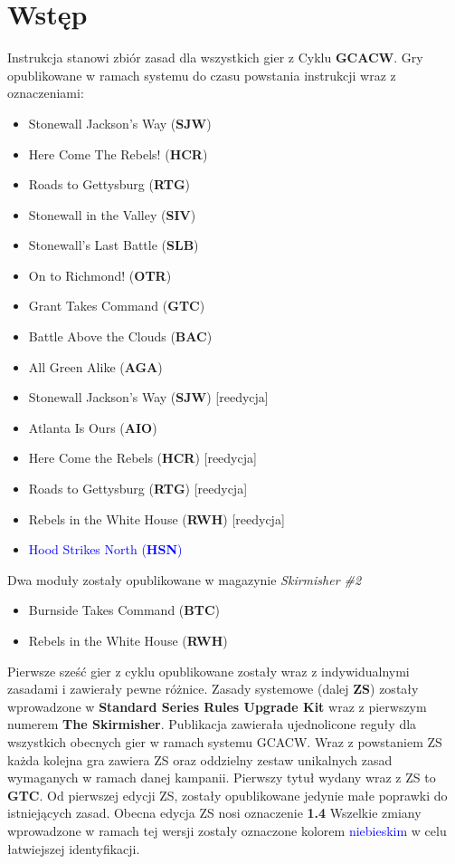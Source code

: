 \section{Wstęp}

Instrukcja stanowi zbiór zasad dla wszystkich gier z Cyklu \textbf{GCACW}. Gry opublikowane w ramach systemu do czasu powstania instrukcji wraz z oznaczeniami:
\begin{itemize}
  \item Stonewall Jackson’s Way (\textbf{SJW})
  \item Here Come The Rebels! (\textbf{HCR})
  \item Roads to Gettysburg (\textbf{RTG})
  \item Stonewall in the Valley (\textbf{SIV})
  \item Stonewall’s Last Battle (\textbf{SLB})
  \item On to Richmond! (\textbf{OTR})
  \item Grant Takes Command (\textbf{GTC})
  \item Battle Above the Clouds (\textbf{BAC})
  \item All Green Alike (\textbf{AGA})
  \item Stonewall Jackson’s Way (\textbf{SJW}) [reedycja]
  \item Atlanta Is Ours (\textbf{AIO})
  \item Here Come the Rebels\! (\textbf{HCR}) [reedycja]
  \item Roads to Gettysburg (\textbf{RTG}) [reedycja]
  \item Rebels in the White House (\textbf{RWH}) [reedycja]
  \item \textcolor{blue}{Hood Strikes North (\textbf{HSN})}
        
\end{itemize}
Dwa moduły zostały opublikowane w magazynie \textit{Skirmisher \#2}
\begin{itemize}
  \item Burnside Takes Command (\textbf{BTC})
  \item Rebels in the White House (\textbf{RWH})
\end{itemize}
Pierwsze sześć gier z cyklu opublikowane zostały wraz z indywidualnymi zasadami i zawierały pewne różnice. Zasady systemowe (dalej \textbf{ZS}) zostały wprowadzone w \textbf{Standard Series Rules Upgrade Kit} wraz z pierwszym numerem \textbf{The Skirmisher}. Publikacja zawierała ujednolicone reguły dla wszystkich obecnych gier w ramach systemu GCACW. Wraz z powstaniem ZS każda kolejna gra zawiera ZS oraz oddzielny zestaw unikalnych zasad wymaganych w ramach danej kampanii. Pierwszy tytuł wydany wraz z ZS to \textbf{GTC}. Od pierwszej edycji ZS, zostały opublikowane jedynie małe poprawki do istniejących zasad. Obecna edycja ZS nosi oznaczenie \textbf{1.4} Wszelkie zmiany wprowadzone w ramach tej wersji zostały oznaczone kolorem \textcolor{blue}{niebieskim} w celu łatwiejszej identyfikacji.\par
